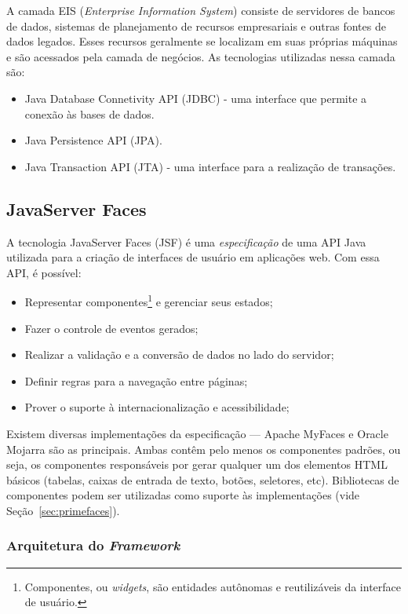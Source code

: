 \documentclass[
  10.5pt,				  %
	openright,			%
	twoside,			  %
  a5paper,
  chapter=TITLE,	%
	section=TITLE,	%
  hyphens,        %
	english,        %
	brazil          %
]{abntex2}
\begin{document}
A camada EIS (\emph{Enterprise Information System}) consiste de servidores de bancos de dados, sistemas de planejamento de recursos empresariais e outras fontes de dados legados. Esses recursos geralmente se localizam em suas próprias máquinas e são acessados pela camada de negócios. As tecnologias utilizadas nessa camada são:
\begin{itemize}
  \item Java Database Connetivity API (JDBC) - uma interface que permite a conexão às bases de dados.
  \item Java Persistence API (JPA).
  \item Java Transaction API (JTA) - uma interface para a realização de transações.
\end{itemize}

\subsection{JavaServer Faces}\label{sec:jsf}

A tecnologia JavaServer Faces (JSF) é uma \emph{especificação} de uma API Java utilizada para a criação de interfaces de usuário em aplicações web. Com essa API, é possível:
%
\begin{itemize}
  \item Representar componentes\footnote{Componentes, ou \emph{widgets}, são entidades autônomas e reutilizáveis da interface de usuário.} e gerenciar seus estados;
  \item Fazer o controle de eventos gerados;
  \item Realizar a validação e a conversão de dados no lado do servidor;
  \item Definir regras para a navegação entre páginas;
  \item Prover o suporte à internacionalização e acessibilidade;
\end{itemize}
%

Existem diversas implementações da especificação --- Apache MyFaces e Oracle Mojarra são as principais. Ambas contêm pelo menos os componentes padrões, ou seja, os componentes responsáveis por gerar qualquer um dos elementos HTML básicos (tabelas, caixas de entrada de texto, botões, seletores, etc). Bibliotecas de componentes podem ser utilizadas como suporte às implementações (vide Seção~\ref{sec:primefaces}).


\subsubsection{Arquitetura do \emph{Framework}}
\end{document}
